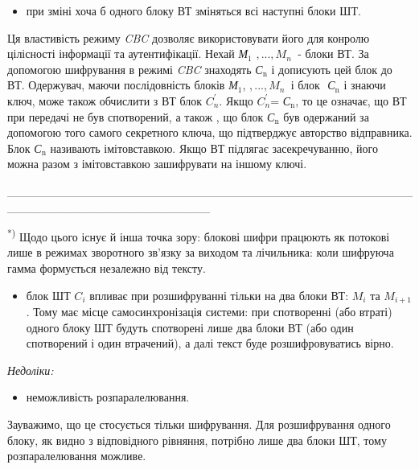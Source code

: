 \documentclass[a4paper]{article}
\newcommand\textsubscript[1]{\ensuremath{{}_{\text{#1}}}}
\newcommand\liststyleWWviiiNumxxvii{%
\renewcommand\labelitemi{\textlatin{[F0B7?]}}
\renewcommand\labelitemii{o}
\renewcommand\labelitemiii{\textlatin{[F0A7?]}}
\renewcommand\labelitemiv{\textlatin{[F0B7?]}}
}
\newcounter{}
\begin{document}
\liststyleWWviiiNumxxvii
\begin{itemize}
\item при зміні хоча б одного блоку ВТ зміняться всі наступні блоки ШТ.
\end{itemize}
Ця властивість режиму \textit{CBC} дозволяє використовувати його для конролю
цілісності інформації та аутентифікації. Нехай \textit{М}\textsubscript{1}
${,\text{.}\text{.}\text{.},M_{{n}}}$\textsubscript{ }{}- блоки ВТ. За
допомогою шифрування в режимі \textit{CBC }знаходять\textit{
С}\textit{\textsubscript{n}} і дописують цей блок до ВТ. Одержувач, маючи
послідовність блоків \textit{М}\textsubscript{1},
${,\text{.}\text{.}\text{.},M_{{n}}}$\textsubscript{ }і блок $ $
\textit{С}\textit{\textsubscript{n}} і знаючи ключ, може також обчислити з ВТ
блок  ${{C}_{{n}}^{'}}$. Якщо  ${{C}_{{n}}^{'}}$=\textit{
С}\textit{\textsubscript{n}}, то це означає, що ВТ при передачі не був
спотворений, а також , що блок \textit{С}\textit{\textsubscript{n}} був
одержаний за допомогою того самого секретного ключа, що підтверджує авторство
відправника. Блок \textit{С}\textit{\textsubscript{n}} називають імітовставкою.
Якщо ВТ підлягає засекречуванню, його можна разом з імітовставкою зашифрувати
на іншому ключі.

\_\_\_\_\_\_\_\_\_\_\_\_\_\_\_\_\_\_\_\_\_\_\_\_\_\_\_\_\_\_\_\_\_\_\_\_\_\_\_\_\_\_\_\_\_\_\_\_\_\_\_\_\_\_\_\_\_\_\_\_\_\_\_\_\_\_\_\_\_\_\_\_

\textsuperscript{*) }Щодо цього існує й інша точка зору: блокові шифри працюють
як потокові лише в режимах зворотного зв’язку за виходом та лічильника:  коли
шифруюча гамма  формується незалежно від тексту.

\liststyleWWviiiNumxxvii
\begin{itemize}
\item блок ШТ  ${C_{{i}}}$ впливає  при розшифруванні тільки на два блоки ВТ: 
${M_{{i}}}$ та  ${M_{{i+1}}}$. Тому має місце самосинхронізація системи: при
спотворенні (або втраті) одного блоку ШТ будуть спотворені лише два блоки ВТ
(або один спотворений і один втрачений), а далі текст буде розшифровуватись
вірно.
\end{itemize}

\bigskip

{\itshape
Недоліки:}

\liststyleWWviiiNumxxvii
\begin{itemize}
\item неможливість розпаралелювання.
\end{itemize}
Зауважимо, що це стосується тільки шифрування. Для розшифрування одного блоку,
як видно з відповідного рівняння, потрібно лише два блоки ШТ, тому
розпаралелювання можливе.
\end{document}
